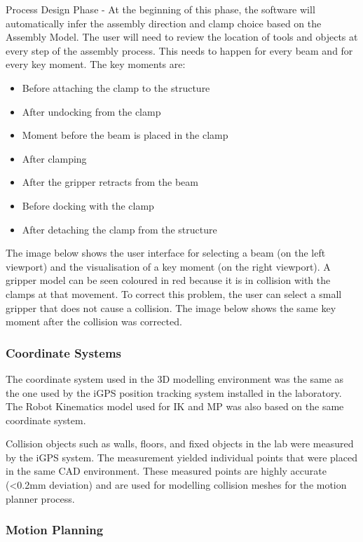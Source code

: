 Process Design Phase - At the beginning of this phase, the software will automatically infer the assembly direction and clamp choice based on the Assembly Model. 
The user will need to review the location of tools and objects at every step of the assembly process. This needs to happen for every beam and for every key moment. The key moments are:
\begin{itemize}
    \item Before attaching the clamp to the structure
    \item After undocking from the clamp
    \item Moment before the beam is placed in the clamp
    \item After clamping
    \item After the gripper retracts from the beam
    \item Before docking with the clamp
    \item After detaching the clamp from the structure
\end{itemize}

The image below shows the user interface for selecting a beam (on the left viewport) and the visualisation of a key moment (on the right viewport). A gripper model can be seen coloured in red because it is in collision with the clamps at that movement. 
To correct this problem, the user can select a small gripper that does not cause a collision. The image below shows the same key moment after the collision was corrected.

\subsubsection{Coordinate Systems}
\label{subsubsection:exploration_2_coordinate_systems}

The coordinate system used in the 3D modelling environment was the same as the one used by the iGPS position tracking system \parencite{stadelmannEndEffectorPoseCorrection2019} installed in the laboratory. The Robot Kinematics model used for IK and MP was also based on the same coordinate system. 

Collision objects such as walls, floors, and fixed objects in the lab were measured by the iGPS system. The measurement yielded individual points that were placed in the same CAD environment. These measured points are highly accurate (<0.2mm deviation) and are used for modelling collision meshes for the motion planner process.

\subsubsection{Motion Planning}
\label{subsubsection:exploration_2_motion_planning}

